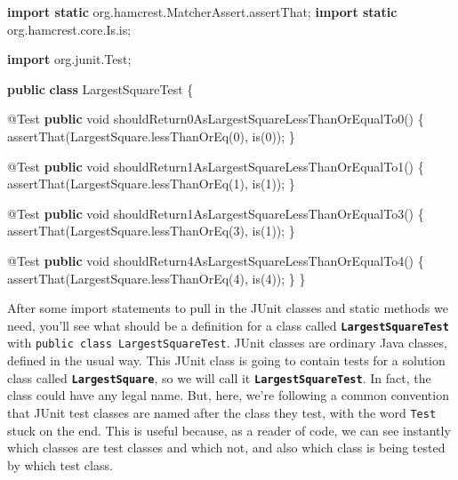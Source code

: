 \documentclass[
]{book}
\newenvironment{Shaded}{\begin{snugshade}}{\end{snugshade}}
\newcommand{\AttributeTok}[1]{\textcolor[rgb]{0.77,0.63,0.00}{#1}}
\newcommand{\DataTypeTok}[1]{\textcolor[rgb]{0.13,0.29,0.53}{#1}}
\newcommand{\DecValTok}[1]{\textcolor[rgb]{0.00,0.00,0.81}{#1}}
\newcommand{\FunctionTok}[1]{\textcolor[rgb]{0.00,0.00,0.00}{#1}}
\newcommand{\ImportTok}[1]{#1}
\newcommand{\KeywordTok}[1]{\textcolor[rgb]{0.13,0.29,0.53}{\textbf{#1}}}
\newcommand{\NormalTok}[1]{#1}
\begin{document}
\begin{Shaded}
\begin{Highlighting}[]
\KeywordTok{import static}\ImportTok{ org.hamcrest.MatcherAssert.assertThat;}
\KeywordTok{import static}\ImportTok{ org.hamcrest.core.Is.is;}

\KeywordTok{import}\ImportTok{ org.junit.Test;}

\KeywordTok{public} \KeywordTok{class}\NormalTok{ LargestSquareTest \{}

    \AttributeTok{@Test}
    \KeywordTok{public} \DataTypeTok{void} \FunctionTok{shouldReturn0AsLargestSquareLessThanOrEqualTo0}\NormalTok{() \{}
        \FunctionTok{assertThat}\NormalTok{(LargestSquare.}\FunctionTok{lessThanOrEq}\NormalTok{(}\DecValTok{0}\NormalTok{), }\FunctionTok{is}\NormalTok{(}\DecValTok{0}\NormalTok{));}
\NormalTok{    \}}

    \AttributeTok{@Test}
    \KeywordTok{public} \DataTypeTok{void} \FunctionTok{shouldReturn1AsLargestSquareLessThanOrEqualTo1}\NormalTok{() \{}
        \FunctionTok{assertThat}\NormalTok{(LargestSquare.}\FunctionTok{lessThanOrEq}\NormalTok{(}\DecValTok{1}\NormalTok{), }\FunctionTok{is}\NormalTok{(}\DecValTok{1}\NormalTok{));}
\NormalTok{    \}}

    \AttributeTok{@Test}
    \KeywordTok{public} \DataTypeTok{void} \FunctionTok{shouldReturn1AsLargestSquareLessThanOrEqualTo3}\NormalTok{() \{}
        \FunctionTok{assertThat}\NormalTok{(LargestSquare.}\FunctionTok{lessThanOrEq}\NormalTok{(}\DecValTok{3}\NormalTok{), }\FunctionTok{is}\NormalTok{(}\DecValTok{1}\NormalTok{));}
\NormalTok{    \}}

    \AttributeTok{@Test}
    \KeywordTok{public} \DataTypeTok{void} \FunctionTok{shouldReturn4AsLargestSquareLessThanOrEqualTo4}\NormalTok{() \{}
        \FunctionTok{assertThat}\NormalTok{(LargestSquare.}\FunctionTok{lessThanOrEq}\NormalTok{(}\DecValTok{4}\NormalTok{), }\FunctionTok{is}\NormalTok{(}\DecValTok{4}\NormalTok{));}
\NormalTok{    \}}
\NormalTok{\}}
\end{Highlighting}
\end{Shaded}

After some import statements to pull in the JUnit classes and static methods we need, you'll see what should be a definition for a class called \textbf{\texttt{LargestSquareTest}} with \texttt{public\ class\ LargestSquareTest}. JUnit classes are ordinary Java classes, defined in the usual way. This JUnit class is going to contain tests for a solution class called \textbf{\texttt{LargestSquare}}, so we will call it \textbf{\texttt{LargestSquareTest}}. In fact, the class could have any legal name. But, here, we're following a common convention that JUnit test classes are named after the class they test, with the word \texttt{Test} stuck on the end. This is useful because, as a reader of code, we can see instantly which classes are test classes and which not, and also which class is being tested by which test class.
\end{document}
